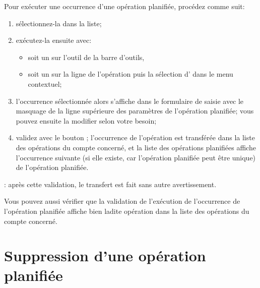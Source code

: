 Pour exécuter une occurrence d'une opération planifiée, procédez comme suit:
\begin{enumerate}
	\item sélectionnez-la dans la liste;
	\item exécutez-la ensuite avec:
		\begin{itemize}
			\item soit un  sur l'outil  de la barre d'outils,
			\item soit un  sur la ligne de l'opération puis la sélection d'  dans le menu contextuel;
		\end{itemize}
	\item l'occurrence sélectionnée alors s'affiche dans le formulaire de saisie avec le masquage de la ligne supérieure des paramètres de l'opération planifiée; vous pouvez ensuite la modifier selon votre besoin;
	\item validez avec le bouton ; l'occurrence de l'opération est transférée dans la liste des opérations du compte concerné, et la liste des opérations planifiées affiche l'occurrence suivante (si elle existe, car l'opération planifiée peut être unique) de l'opération planifiée.
\end{enumerate}

\Note{}: après cette validation, le transfert est fait sans autre avertissement.

Vous pouvez aussi vérifier que la validation de l'exécution de l'occurrence de l'opération planifiée affiche bien ladite opération dans la liste des opérations du compte concerné.


\section{Suppression d'une opération planifiée\label{plannedtransactions-remove}}

